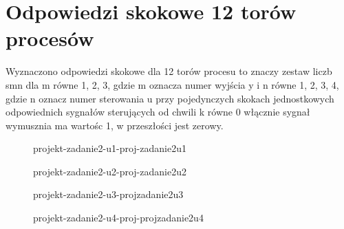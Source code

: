 \section{Odpowiedzi skokowe 12 torów procesów}
\label{projekt:zad2}


Wyznaczono odpowiedzi skokowe dla 12 torów procesu to znaczy zestaw liczb smn dla m równe 1, 2, 3, 
gdzie m oznacza numer wyjścia y i n równe 1, 2, 3, 4, 
gdzie n oznacz numer sterowania u przy pojedynczych skokach jednostkowych odpowiednich sygnałów  sterujących
od chwili k równe 0 włącznie sygnał wymusznia ma wartośc 1, 
w przeszłości jest zerowy.


\ifdefined\CompileFigures
\begin{figure}[H] 
    \centering
    
    \caption{projekt-zadanie2-u1-proj-zadanie2u1}
    \label{projekt:zad2:figure:projzadanie2u1}
\end{figure}
\fi

\ifdefined\CompileFigures
\begin{figure}[H] 
    \centering
    
    \caption{projekt-zadanie2-u2-proj-zadanie2u2}
    \label{projekt:zad2:figure:projzadanie2u2}
\end{figure}
\fi

\ifdefined\CompileFigures
\begin{figure}[H] 
    \centering
    
    \caption{projekt-zadanie2-u3-projzadanie2u3}
    \label{projekt:zad2:figure:projzadanie2u3}
\end{figure}
\fi

\ifdefined\CompileFigures
\begin{figure}[H] 
    \centering
    
    \caption{projekt-zadanie2-u4-proj-projzadanie2u4}
    \label{projekt:zad2:figure:projzadanie2u4}
\end{figure}
\fi

\newpage
